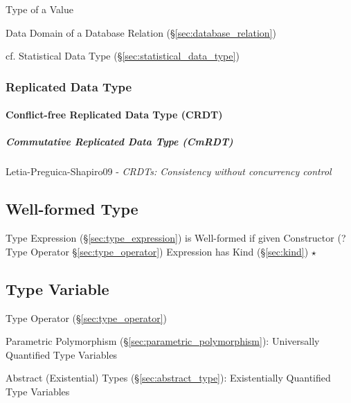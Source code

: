 Type of a Value

\fist Data Domain of a Database Relation (\S\ref{sec:database_relation})

\fist cf. Statistical Data Type (\S\ref{sec:statistical_data_type})



\subsubsection{Replicated Data Type}\label{sec:replicated_data_type}

\paragraph{Conflict-free Replicated Data Type (CRDT)}\label{sec:crdt}\hfill

\subparagraph{Commutative Replicated Data Type (CmRDT)}\label{sec:cmrdt}\hfill

Letia-Preguica-Shapiro09 - \emph{CRDTs: Consistency without concurrency control}



\subsection{Well-formed Type}\label{sec:wellformed_type}


Type Expression (\S\ref{sec:type_expression}) is Well-formed if given
Constructor (? Type Operator \S\ref{sec:type_operator}) Expression has
Kind (\S\ref{sec:kind}) $\star$



\subsection{Type Variable}\label{sec:type_variable}

Type Operator (\S\ref{sec:type_operator})

Parametric Polymorphism (\S\ref{sec:parametric_polymorphism}):
Universally Quantified Type Variables

Abstract (Existential) Types (\S\ref{sec:abstract_type}):
Existentially Quantified Type Variables



